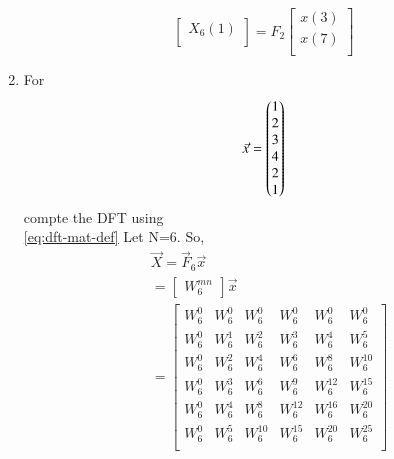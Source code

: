\documentclass[journal,12pt,twocolumn]{IEEEtran}
\renewcommand\thesection{\arabic{section}}
\begin{document}
\begin{enumerate}[label=\arabic*.,ref=\thesection.\theenumi]
\begin{equation}
\begin{bmatrix}
                     X_{6}(1) \\
                \end{bmatrix}
                = F_{2}
                \begin{bmatrix}
                     x(3) \\
                     x(7) \\
                \end{bmatrix}
           \end{equation}
     \item For
           \begin{align}
                \vec{x} = \begin{pmatrix}1 \\2\\3\\4\\2\\1\end{pmatrix}
                \label{eq:equation1}
           \end{align}
           compte the DFT
           using \\
           \eqref{eq:dft-mat-def}
           \solution Let N=6. So,
           \begin{align}
                 & \vec{X}=\vec{F}_6\vec{x}                                                                                                                          \\
                 & =\begin{bmatrix}
                         W_6^{mn}
                    \end{bmatrix}\vec{x}                                                                                                                             \\
                 & =\begin{bmatrix}
                         W_6^0 & W_6^0 & W_6^0    & W_6^0    & W_6^0    & W_6^0    \\
                         W_6^0 & W_6^1 & W_6^2    & W_6^3    & W_6^4    & W_6^5    \\
                         W_6^0 & W_6^2 & W_6^4    & W_6^6    & W_6^8    & W_6^{10} \\
                         W_6^0 & W_6^3 & W_6^6    & W_6^9    & W_6^{12} & W_6^{15} \\
                         W_6^0 & W_6^4 & W_6^8    & W_6^{12} & W_6^{16} & W_6^{20} \\
                         W_6^0 & W_6^5 & W_6^{10} & W_6^{15} & W_6^{20} & W_6^{25} \\

\end{bmatrix}
\end{align}
\end{enumerate}
\end{document}
